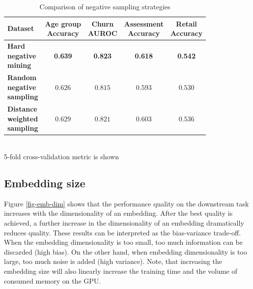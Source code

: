 \documentclass[sigconf]{acmart}
\begin{document}
\begin{table}
\centering
\caption{Comparison of negative sampling strategies}
\begin{tabular}{lcccc}
\toprule
\textbf{Dataset} &
\makecell{\textbf{Age group} \\ \small{Accuracy}} & \makecell{\textbf{Churn} \\ \small{AUROC}} & \makecell{\textbf{Assessment} \\ \small{Accuracy}} & \makecell{\textbf{Retail} \\ \small{Accuracy}} \\
\midrule

\makecell[l]{\textbf{Hard} \\ \textbf{negative} \\ \textbf{mining}} & \textbf{0.639} & \textbf{0.823} & \textbf{0.618} & \textbf{0.542} \\
\makecell[l]{\textbf{Random} \\ \textbf{negative} \\ \textbf{sampling}} & $0.626$ & $0.815$ & $0.593$ & $0.530$ \\
\makecell[l]{\textbf{Distance} \\ \textbf{weighted} \\ \textbf{sampling}} & $0.629$ & $0.821$ & $0.603$ & $0.536$ \\

\bottomrule
\end{tabular} \\
\small{5-fold cross-validation metric is shown}
\label{tab-neg-sampl}
\end{table}

\subsection{Embedding size}

Figure \ref{fig-emb-dim} shows that the performance quality on the downstream task increases with the dimensionality of an embedding. After the best quality is achieved, a further increase in the dimensionality of an embedding dramatically reduces quality.
These results can be interpreted as the bias-variance trade-off. When the embedding dimensionality is too small, too much information can be discarded (high bias). On the other hand, when embedding dimensionality is too large, too much noise is added (high variance).
Note, that increasing the embedding size will also linearly increase the training time and the volume of consumed memory on the GPU.
\end{document}
